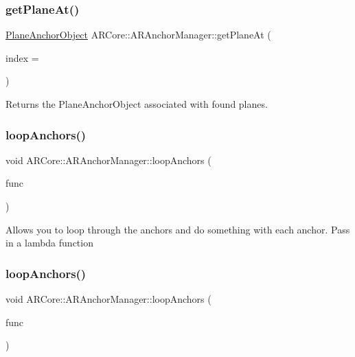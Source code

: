 \subsubsection{\texorpdfstring{get\+Plane\+At()}{getPlaneAt()}}
{\footnotesize\ttfamily \mbox{\hyperlink{struct_a_r_objects_1_1_plane_anchor_object}{Plane\+Anchor\+Object}} A\+R\+Core\+::\+A\+R\+Anchor\+Manager\+::get\+Plane\+At (\begin{DoxyParamCaption}\item[{int}]{index = {} }\end{DoxyParamCaption})}



Returns the Plane\+Anchor\+Object associated with found planes. 

\mbox{\label{class_a_r_core_1_1_a_r_anchor_manager_a687246a5f0aacaac63053c0e05081e11}} 
\subsubsection{\texorpdfstring{loop\+Anchors()}{loopAnchors()}\hspace{0.1cm}{\footnotesize\ttfamily [1/2]}}
{\footnotesize\ttfamily void A\+R\+Core\+::\+A\+R\+Anchor\+Manager\+::loop\+Anchors (\begin{DoxyParamCaption}\item[{std\+::function$<$ void(\mbox{\hyperlink{struct_a_r_objects_1_1_a_r_object}{A\+R\+Object}})$>$}]{func }\end{DoxyParamCaption})}

Allows you to loop through the anchors and do something with each anchor. Pass in a lambda function \mbox{\label{class_a_r_core_1_1_a_r_anchor_manager_a03ee4092b5d958f8b1467e0a0e62f9b9}} 
\subsubsection{\texorpdfstring{loop\+Anchors()}{loopAnchors()}\hspace{0.1cm}{\footnotesize\ttfamily [2/2]}}
{\footnotesize\ttfamily void A\+R\+Core\+::\+A\+R\+Anchor\+Manager\+::loop\+Anchors (\begin{DoxyParamCaption}\item[{std\+::function$<$ void(\mbox{\hyperlink{struct_a_r_objects_1_1_a_r_object}{A\+R\+Object}}, int index)$>$}]{func }\end{DoxyParamCaption})}

